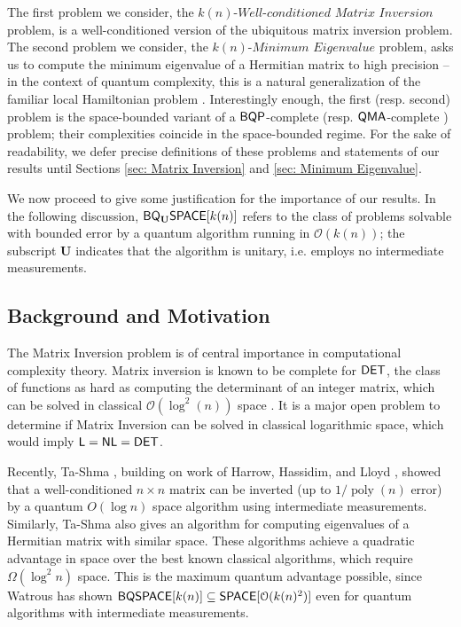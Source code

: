 \documentclass[a4paper,UKenglish]{lipics-v2016}
\newcommand\DET{{\sf{DET}}}
\newcommand\QMA{{\sf{QMA}}}
\newcommand\DSPACE{{\sf{SPACE}}}
\newcommand\BQSPACE{{\sf{BQSPACE}}}
\newcommand\BQP{{\sf{BQP}}}
\newcommand\Logspace{{\sf{L}}}
\newcommand\NL{{\sf{NL}}}
\newcommand\matrixinvert[1]{{\ensuremath{#1}}\textit{-Well-conditioned Matrix Inversion}}
\newcommand\spechamiltonian[1]{\ensuremath{#1}\textit{-Minimum Eigenvalue}}
\newcommand{\classfont}{\sf}
\newcommand{\Unitary}{\mathbf{U}}
\newcommand{\unitaryBQSPACE}[1]{{\classfont{BQ}_\Unitary\classfont{SPACE}}[#1]}
\newcommand\bigoh{\mathcal{O}}
\DeclareMathOperator{\poly}{poly}
\begin{document}
The first problem we consider, the $\matrixinvert{k(n)}$ problem, is a well-conditioned version of the ubiquitous matrix inversion problem. The second problem we consider, the $\spechamiltonian{k(n)}$ problem, asks us to compute the minimum eigenvalue of a Hermitian matrix to high precision -- in the context of quantum complexity, this is a natural generalization of the familiar local Hamiltonian problem \cite{ksv02}. Interestingly enough, the first (resp. second) problem is the space-bounded variant of a $\BQP$-complete \cite{HHL} (resp. $\QMA$-complete \cite{ksv02}) problem; their complexities coincide in the space-bounded regime. For the sake of readability, we defer precise definitions of these problems and statements of our results until Sections \ref{sec: Matrix Inversion} and \ref{sec: Minimum Eigenvalue}.

We now proceed to give some justification for the importance of our results.  In the following discussion, $\unitaryBQSPACE{k(n)}$ refers to the class of problems solvable with bounded error by a quantum algorithm running in $\mathcal{O}(k(n))$; the subscript $\Unitary$ indicates that the algorithm is unitary, i.e. employs no intermediate measurements.

\subsection{Background and Motivation}
The Matrix Inversion problem is of central importance in computational complexity theory.  Matrix inversion is known to be complete for $\DET$, the class of functions as hard as computing the determinant of an integer matrix, which can be solved in classical $\mathcal{O}(\log^{2}(n))$ space \cite{berkowitz, cook}. It is a major open problem to determine if Matrix Inversion can be solved in classical logarithmic space, which would imply $\Logspace=\NL=\DET$.
 
Recently, Ta-Shma \cite{tashma}, building on work of Harrow, Hassidim, and Lloyd \cite{HHL}, showed that a well-conditioned $n \times n$ matrix can be inverted (up to $1/\poly(n)$ error) by a quantum $O(\log n)$ space algorithm using intermediate measurements. Similarly, Ta-Shma also gives an algorithm for computing eigenvalues of a Hermitian matrix with similar space. These algorithms achieve a quadratic advantage in space over the best known classical algorithms, which require $\Omega(\log^2n)$ space.  This is the maximum quantum advantage possible, since Watrous has shown $\BQSPACE[k(n)]\subseteq\DSPACE[\bigoh(k(n)^2)]$ \cite{Watrous99,Watrous03} even for quantum algorithms with intermediate measurements.
\end{document}
